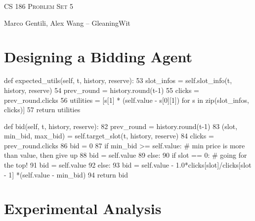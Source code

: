 \documentclass[12pt]{article}
\begin{document}
\thispagestyle{empty}

\begin{center}
{\Large \textsc{CS 186 Problem Set 5}}

\bigskip

Marco Gentili, Alex Wang -- GleaningWit
\end{center}

\section{Designing a Bidding Agent}

\begin{python}
def expected_utils(self, t, history, reserve):                                                   
 53         slot_infos = self.slot_info(t, history, reserve)                        
 54         prev_round = history.round(t-1)                                         
 55         clicks = prev_round.clicks                                              
 56         utilities = [s[1] * (self.value - s[0][1]) for s 
            in zip(slot_infos, clicks)]
 57         return utilities   
\end{python}


\begin{python}
def bid(self, t, history, reserve):                 
 82         prev_round = history.round(t-1)                                         
 83         (slot, min_bid, max_bid) = self.target_slot(t, history, reserve)        
 84         clicks = prev_round.clicks                                      
 86         bid = 0                                                                 
 87         if min_bid >= self.value: # min price is more than value, then give up  
 88             bid = self.value                                                    
 89         else:                                                                   
 90             if slot == 0: # going for the top!                                  
 91                 bid = self.value                                                
 92             else:                                                               
 93                 bid = self.value - 1.0*clicks[slot]/clicks[slot - 1]
                    *(self.value - min_bid)
 94         return bid       
\end{python}
\section{Experimental Analysis}
\end{document}
